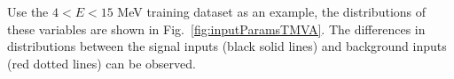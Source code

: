 Use the $4<E<15$ MeV training dataset as an example, the distributions of these variables are shown in Fig.~\ref{fig:inputParamsTMVA}. The differences in distributions between the signal inputs (black solid lines) and background inputs (red dotted lines) can be observed.

\begin{figure}[htbp]
	\centering
   \subfigure[$Z_{factor}$]{
}
\end{figure}
